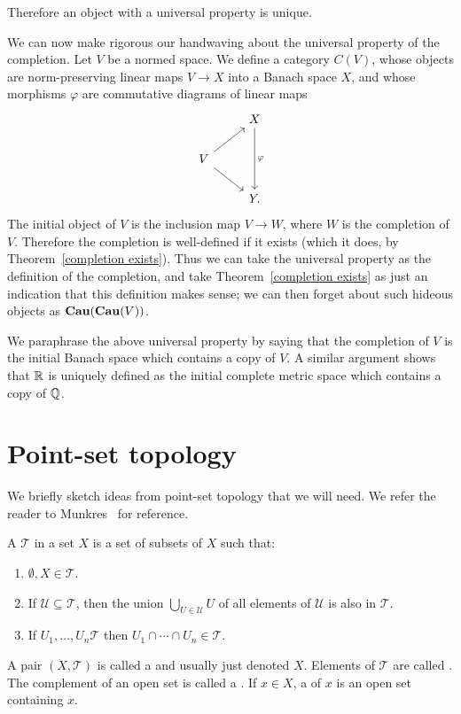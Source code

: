 \begin{subsec}
Therefore an object with a universal property is unique.
\end{subsec}

\begin{subsec}
We can now make rigorous our handwaving about the universal property of the completion.
Let $V$ be a normed space. We define a category $C(V)$, whose objects are norm-preserving linear maps $V \to X$ into a Banach space $X$, and whose morphisms $\varphi$ are commutative diagrams of linear maps
$$\begin{tikzcd}&X \arrow[dd,"\varphi"]\\
V \arrow[ur] \arrow[dr]\\
&Y.\end{tikzcd}$$
The initial object of $V$ is the inclusion map $V \to W$, where $W$ is the completion of $V$.
Therefore the completion is well-defined if it exists (which it does, by Theorem~\ref{completion exists}).
Thus we can take the universal property as the definition of the completion, and take Theorem~\ref{completion exists} as just an indication that this definition makes sense; we can then forget about such hideous objects as $\mathbf{Cau}(\mathbf{Cau}(V))$.
\end{subsec}

\begin{subsec}
We paraphrase the above universal property by saying that the completion of $V$ is the initial Banach space which contains a copy of $V$.
A similar argument shows that $\mathbb{R}$ is uniquely defined as the initial complete metric space which contains a copy of $\mathbb{Q}$.
\end{subsec}

\section{Point-set topology}
We briefly sketch ideas from point-set topology that we will need.
We refer the reader to Munkres~\cite{munkres2000topology} for reference.

\begin{definition}
A  $\mathcal T$ in a set $X$ is a set of subsets of $X$ such that:
\begin{enumerate}
\item $\emptyset, X \in \mathcal T$.
\item If $\mathcal U \subseteq \mathcal T$, then the union $\bigcup_{U \in \mathcal U} U$ of all elements of $\mathcal U$ is also in $\mathcal T$.
\item If $U_1, \dots, U_{n} \mathcal T$ then $U_1 \cap \cdots \cap U_{n} \in \mathcal T$.
\end{enumerate}
A pair $(X, \mathcal T)$ is called a  and usually just denoted $X$.
Elements of $\mathcal T$ are called .
The complement of an open set is called a .
If $x \in X$, a  of $x$ is an open set containing $x$.
\end{definition}

